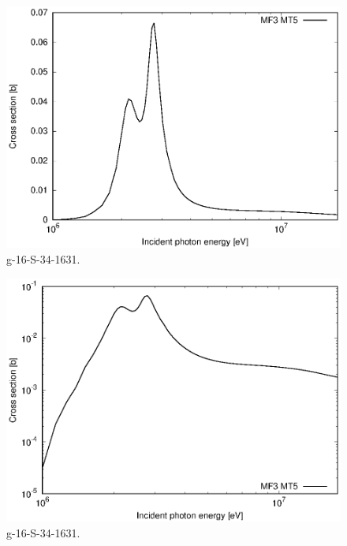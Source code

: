 \begin{figure}
 \includegraphics[width=\linewidth]{eps/g_16-S-34_1631.eps}
  \caption{g-16-S-34-1631.}
\end{figure}
\begin{figure}
 \includegraphics[width=\linewidth]{eps-log/g_16-S-34_1631.eps}
 \caption{g-16-S-34-1631.}
\end{figure}
\newpage \clearpage

